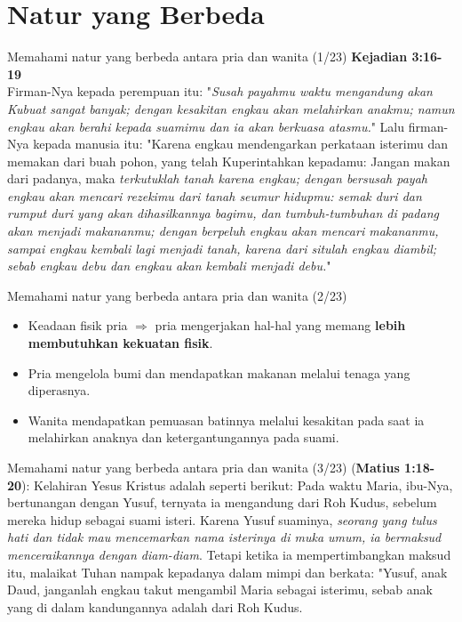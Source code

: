 \documentclass{beamer}
\theoremstyle{mystyle}
\let\emph\relax %
\begin{document}
\section{Natur yang Berbeda}
\begin{frame}{Memahami natur yang berbeda antara pria dan wanita (1/23)}
		\textbf{Kejadian 3:16-19} \\
Firman-Nya kepada perempuan itu: "\textit{Susah payahmu waktu mengandung akan Kubuat sangat banyak; dengan kesakitan engkau akan melahirkan anakmu; namun engkau akan berahi kepada suamimu dan ia akan berkuasa atasmu.}" Lalu firman-Nya kepada manusia itu: "Karena engkau mendengarkan perkataan isterimu dan memakan dari buah pohon, yang telah Kuperintahkan kepadamu: Jangan makan dari padanya, maka \textit{terkutuklah tanah karena engkau; dengan bersusah payah engkau akan mencari rezekimu dari tanah seumur hidupmu: semak duri dan rumput duri yang akan dihasilkannya bagimu, dan tumbuh-tumbuhan di padang akan menjadi makananmu; dengan berpeluh engkau akan mencari makananmu, sampai engkau kembali lagi menjadi tanah, karena dari situlah engkau diambil; sebab engkau debu dan engkau akan kembali menjadi debu.}"
\end{frame}

\begin{frame}{Memahami natur yang berbeda antara pria dan wanita (2/23)}
	\begin{itemize}		
		\item Keadaan fisik pria $\Longrightarrow$ pria mengerjakan hal-hal yang memang \textbf{lebih membutuhkan kekuatan fisik}.
		
		\bigskip

		\item  Pria mengelola bumi dan mendapatkan makanan melalui tenaga yang diperasnya.
		
		\bigskip
		
		\item Wanita mendapatkan pemuasan batinnya melalui kesakitan pada saat ia melahirkan anaknya dan ketergantungannya pada suami.				
	\end{itemize}
\end{frame}

\begin{frame}{Memahami natur yang berbeda antara pria dan wanita (3/23)}
\emph{Yusuf} (\textbf{Matius 1:18-20}): Kelahiran Yesus Kristus adalah seperti berikut: Pada waktu Maria, ibu-Nya, bertunangan dengan Yusuf, ternyata ia mengandung dari Roh Kudus, sebelum mereka hidup sebagai suami isteri. Karena Yusuf suaminya, \textit{seorang yang tulus hati dan tidak mau mencemarkan nama isterinya di muka umum, ia bermaksud menceraikannya dengan diam-diam}. Tetapi ketika ia mempertimbangkan maksud itu, malaikat Tuhan nampak kepadanya dalam mimpi dan berkata: "Yusuf, anak Daud, janganlah engkau takut mengambil Maria sebagai isterimu, sebab anak yang di dalam kandungannya adalah dari Roh Kudus. 		
\end{frame}
\end{document}
